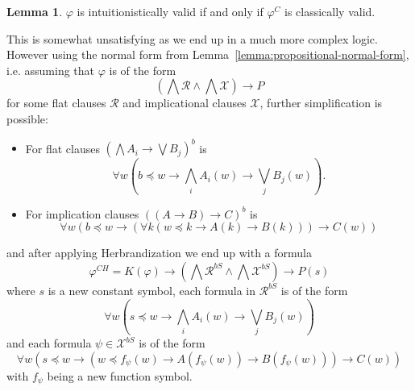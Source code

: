 \documentclass{easychair}
\theoremstyle{definition}
\theoremstyle{definition}
\theoremstyle{definition}
\newtheorem{lemma}[theorem]{Lemma}
\theoremstyle{definition}
\theoremstyle{definition}
\theoremstyle{definition}
\theoremstyle{definition}
\begin{document}
\begin{lemma}
	$\varphi$ is intuitionistically valid if and only if $\varphi^C$ is classically valid.
\end{lemma}

This is somewhat unsatisfying as we end up in a much more complex logic. However using the normal form from Lemma~\ref{lemma:propositional-normal-form}, i.e. assuming that $\varphi$ is of the form $$\left(\bigwedge\mathcal R\wedge\bigwedge\mathcal X\right)\to P$$ for some flat clauses $\mathcal R$ and implicational clauses $\mathcal X$, further simplification is possible:
\begin{itemize}
	\item For flat clauses $(\bigwedge A_i\to\bigvee B_j)^b$ is
	$$\forall w\left(b\preceq w\to\bigwedge_i A_i(w)\to\bigvee_jB_j(w)\right).$$
	\item For implication clauses $((A\to B)\to C)^b$ is
	$$\forall w(b\preceq w\to(\forall k(w\preceq k\to A(k)\to B(k)))\to C(w))$$
\end{itemize}

and after applying Herbrandization we end up with a formula $$\varphi^{CH} = K(\varphi)\to\left(\bigwedge\mathcal R^{b S}\wedge \bigwedge\mathcal X^{b S}\right)\to P(s)$$ where $s$ is a new constant symbol, each formula in $\mathcal R^{b S}$ is of the form
$$\forall w\left(s\preceq w\to\bigwedge_iA_i(w)\to\bigvee_jB_j(w)\right)$$
and each formula $\psi\in\mathcal X^{b S}$ is of the form
$$\forall w(s\preceq w\to(w\preceq f_\psi(w)\to A(f_\psi(w))\to B(f_\psi(w)))\to C(w))$$
with $f_\psi$ being a new function symbol.
\end{document}
